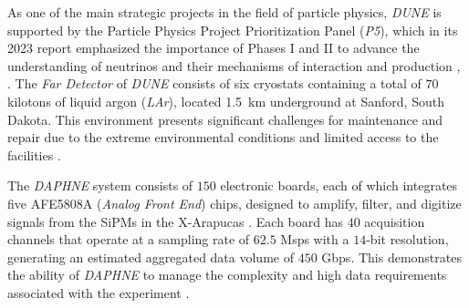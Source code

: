 As one of the main strategic projects in the field of particle physics, \textit{DUNE} is supported by the Particle Physics Project Prioritization Panel (\textit{P5}), which in its 2023 report emphasized the importance of Phases I and II to advance the understanding of neutrinos and their mechanisms of interaction and production \cite{DUNE_Phase_II}, \cite{P5_Report}. The \textit{Far Detector} of \textit{DUNE} consists of six cryostats containing a total of $70$ kilotons of liquid argon (\textit{LAr}), located \SI{1.5}{\kilo\meter} underground at Sanford, South Dakota. This environment presents significant challenges for maintenance and repair due to the extreme environmental conditions and limited access to the facilities \cite{Abi2020}. %




The \textit{DAPHNE} system consists of $150$ electronic boards, each of which integrates five AFE5808A (\textit{Analog Front End}) chips, designed to amplify, filter, and digitize signals from the SiPMs in the X-Arapucas \cite{Abi2020, Falcone2021}. Each board has $40$ acquisition channels that operate at a sampling rate of $62.5$ Msps with a $14$-bit resolution, generating an estimated aggregated data volume of $450$ Gbps. This demonstrates the ability of \textit{DAPHNE} to manage the complexity and high data requirements associated with the experiment \cite{Abi_2020, Abi2020C, Abi2020}. %


